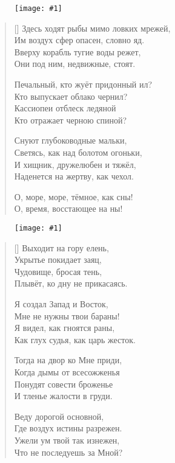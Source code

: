 \documentclass[12pt,a5paper,twoside]{article}
\newcommand{\pict}[1]{\thispagestyle{empty}\begin{figure}[H]\begin{center}\texttt{[image: \#1]}\end{center}\end{figure}\newpage}
\begin{document}
\pict{picts/Zdes_hodiat_rybi_megdu_lovkix_mregey} 
%



\settowidth{\versewidth}{Здесь ходят рыбы мимо ловких мрежей,}
\begin{verse}[\versewidth]
Здесь ходят рыбы мимо ловких мрежей,\\
Им воздух сфер опасен, словно яд.\\
Вверху корабль тугие воды режет,\\
Они под ним, недвижные, стоят.

Печальный, кто жуёт придонный ил?\\
Кто выпускает облако чернил?\\
Кассиопеи отблеск ледяной\\
Кто отражает черною спиной?

Снуют глубоководные мальки,\\
Светясь, как над болотом огоньки,\\
И хищник, дружелюбен и тяжёл,\\
Наденется на жертву, как чехол.

О, море, море, тёмное, как сны!\\
О, время, восстающее на ны!
\end{verse}
\newpage




\pict{picts/Vihodit_na_goru_elen} 
%



\settowidth{\versewidth}{Выходит на гору елень,}
\begin{verse}[\versewidth]
Выходит на гору елень,\\
Укрытье покидает заяц,\\
Чудовище, бросая тень,\\
Плывёт, ко дну не прикасаясь.

Я создал Запад и Восток,\\
Мне не нужны твои бараны!\\
Я видел, как гноятся раны,\\
Как глух судья, как царь жесток.

Тогда на двор ко Мне приди,\\
Когда дымы от всесожженья\\
Понудят совести броженье\\
И тленье жалости в груди.

Веду дорогой основной,\\
Где воздух истины разрежен.\\
Ужели ум твой так изнежен,\\
Что не последуешь за Мной?
\end{verse}
\newpage
\end{document}
